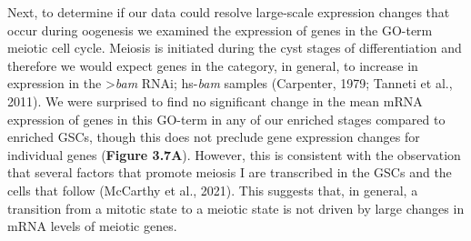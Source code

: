 \documentclass[12pt,oneside]{reedthesis}
\begin{document}
Next, to determine if our data could resolve large-scale expression
changes that occur during oogenesis we examined the expression of genes
in the GO-term meiotic cell cycle. Meiosis is initiated during the cyst
stages of differentiation and therefore we would expect genes in the
category, in general, to increase in expression in the \textgreater{}\emph{bam} RNAi;
hs-\emph{bam} samples (Carpenter, 1979; Tanneti et al., 2011). We were surprised to find no
significant change in the mean mRNA expression of genes in this GO-term
in any of our enriched stages compared to enriched GSCs, though this
does not preclude gene expression changes for individual genes
(\textbf{Figure 3.7A}). However, this is consistent with the
observation that several factors that promote meiosis I are transcribed
in the GSCs and the cells that follow
(McCarthy et al., 2021). This suggests that, in general,
a transition from a mitotic state to a meiotic state is not driven by
large changes in mRNA levels of meiotic genes.
\end{document}
